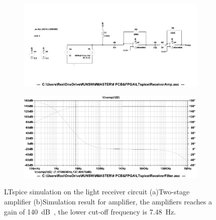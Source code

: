 \begin{figure}[H]
\centering
\begin{subfigure}{1\textwidth}
  \centering
  \includegraphics[width=1\linewidth]{4-ANC_Sys/LTspiceAmpSch.pdf}
  \caption{}
  \label{fig_LTspiceAmpSch}
\end{subfigure}
\begin{subfigure}{1\textwidth}
  \centering
  \includegraphics[width=1\linewidth]{4-ANC_Sys/LTspiceAmp.pdf}
  \caption{}
  \label{fig_LTspiceAmp}
\end{subfigure}
\caption{LTspice simulation on the light receiver circuit (a)Two-stage amplifier (b)Simulation result for amplifier, the amplifiers reaches a gain of \qty{140}{dB\Omega}, the lower cut-off frequency is \qty{7.48}{Hz}.}
\label{fig_LTspiceSim1}
\end{figure}

